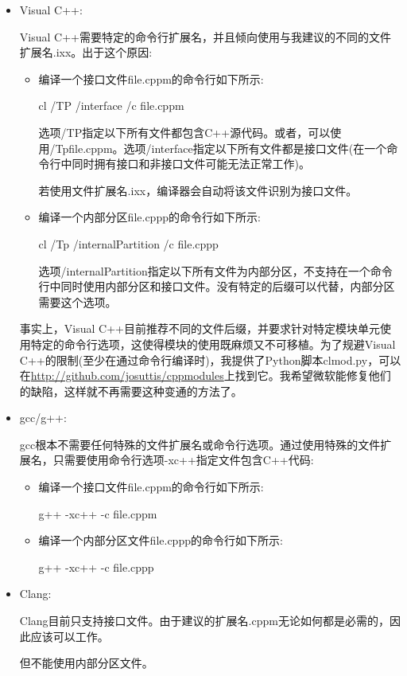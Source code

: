 \begin{itemize}
\item
Visual C++:

Visual C++需要特定的命令行扩展名，并且倾向使用与我建议的不同的文件扩展名.ixx。出于这个原因:

\begin{itemize}
\item
编译一个接口文件file.cppm的命令行如下所示:

\begin{shell}
cl /TP /interface /c file.cppm
\end{shell}

选项/TP指定以下所有文件都包含C++源代码。或者，可以使用/Tpfile.cppm。选项/interface指定以下所有文件都是接口文件(在一个命令行中同时拥有接口和非接口文件可能无法正常工作)。

若使用文件扩展名.ixx，编译器会自动将该文件识别为接口文件。

\item
编译一个内部分区file.cppp的命令行如下所示:

\begin{shell}
cl /Tp /internalPartition /c file.cppp
\end{shell}

选项/internalPartition指定以下所有文件为内部分区，不支持在一个命令行中同时使用内部分区和接口文件。没有特定的后缀可以代替，内部分区需要这个选项。
\end{itemize}

事实上，Visual C++目前推荐不同的文件后缀，并要求针对特定模块单元使用特定的命令行选项，这使得模块的使用既麻烦又不可移植。为了规避Visual C++的限制(至少在通过命令行编译时)，我提供了Python脚本clmod.py，可以在\url{http://github.com/josuttis/cppmodules}上找到它。我希望微软能修复他们的缺陷，这样就不再需要这种变通的方法了。

\item
gcc/g++:

gcc根本不需要任何特殊的文件扩展名或命令行选项。通过使用特殊的文件扩展名，只需要使用命令行选项-xc++指定文件包含C++代码:

\begin{itemize}
\item
编译一个接口文件file.cppm的命令行如下所示:

\begin{shell}
g++ -xc++ -c file.cppm
\end{shell}

\item
编译一个内部分区文件file.cppp的命令行如下所示:

\begin{shell}
g++ -xc++ -c file.cppp
\end{shell}
\end{itemize}

\item
Clang:

Clang目前只支持接口文件。由于建议的扩展名.cppm无论如何都是必需的，因此应该可以工作。

但不能使用内部分区文件。
\end{itemize}

